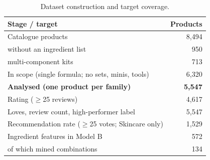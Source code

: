 \begin{table}[htbp]
\centering
\small
\begin{tabular}{|l|r|}
\hline
\rowcolor{headfill} \textbf{Stage / target} & \textbf{Products} \\
\hline
Catalogue products & 8,494 \\
\hline
\quad without an ingredient list & 950 \\
\hline
\quad multi-component kits & 713 \\
\hline
In scope (single formula; no sets, minis, tools) & 6,320 \\
\hline
\textbf{Analysed (one product per family)} & \textbf{5,547} \\
\hline
\hline
Rating ($\geq$25 reviews) & 4,617 \\
\hline
Loves, review count, high-performer label & 5,547 \\
\hline
Recommendation rate ($\geq$25 votes; Skincare only) & 1,529 \\
\hline
\hline
Ingredient features in Model B & 572 \\
\hline
\quad of which mined combinations & 134 \\
\hline
\end{tabular}
\caption{Dataset construction and target coverage.}
\label{tab:dataset}
\end{table}
